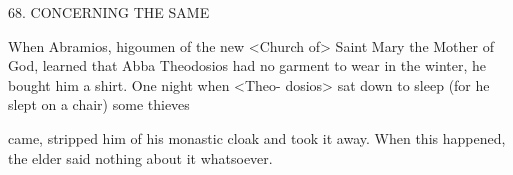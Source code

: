 68.
CONCERNING THE SAME

When Abramios, higoumen of the new <Church of> Saint Mary the
Mother of God, learned that Abba Theodosios had no garment to
wear in the winter, he bought him a shirt.
One night when <Theo-
dosios> sat down to sleep (for he slept on a chair) some thieves

came, stripped him of his monastic cloak and took it away.
When
this happened, the elder said nothing about it whatsoever.

